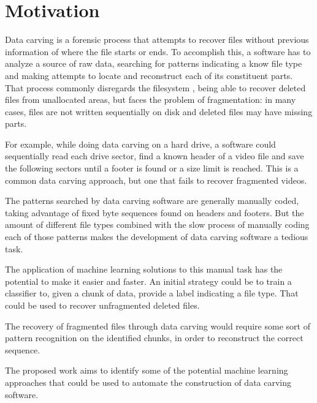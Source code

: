 \section{Motivation}

Data carving is a forensic process that attempts to recover files without previous information of where the file starts or ends\cite{garfinkel_carving_2007}.
To accomplish this, a software has to analyze a source of raw data, searching for patterns indicating a know file type and making attempts to locate and reconstruct each of its constituent parts.
That process commonly disregards the filesystem \cite{veenman_statistical_2007}, being able to recover deleted files from unallocated areas, but faces the problem of fragmentation\cite{veenman_statistical_2007}\cite{pal_evolution_2009}: in many cases, files are not written sequentially on disk and deleted files may have missing parts.

For example, while doing data carving on a hard drive, a software could sequentially read each drive sector, find a known header of a video file and save the following sectors until a footer is found or a size limit is reached. This is a common data carving approach, but one that fails to recover fragmented videos.

The patterns searched by data carving software are generally manually coded, taking advantage of fixed byte sequences found on headers and footers. But the amount of different file types combined with the slow process of manually coding each of those patterns makes the development of data carving software a tedious task\cite{mcdaniel_content_2003}.

The application of machine learning solutions to this manual task has the potential to make it easier and faster. An initial strategy could be to train a classifier to, given a chunk of data, provide a label indicating a file type. That could be used to recover unfragmented deleted files.

The recovery of fragmented files through data carving would require some sort of pattern recognition on the identified chunks, in order to reconstruct the correct sequence.

The proposed work aims to identify some of the potential machine learning approaches that could be used to automate the construction of data carving software.

